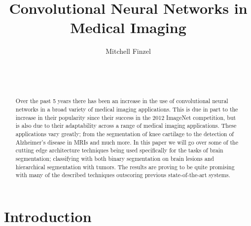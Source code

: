 \documentclass{sig-alternate}
\begin{document}

\title{Convolutional Neural Networks in Medical Imaging}


\author{
\alignauthor
Mitchell Finzel\\
	\\
	\\
	\\
}

\maketitle
\begin{abstract}
Over the past 5 years there has been an increase in the use of convolutional neural networks in a broad variety of medical imaging applications. This is due in part to the increase in their popularity since their success in the 2012 ImageNet competition, but is also due to their adaptability across a range of medical imaging applications. These applications vary greatly; from the segmentation of knee cartilage to the detection of Alzheimer's disease in MRIs and much more. In this paper we will go over some of the cutting edge architecture techniques being used specifically for the tasks of brain segmentation; classifying with both binary segmentation on brain lesions and hierarchical segmentation with tumors. The results are proving to be quite promising with many of the described techniques outscoring previous state-of-the-art systems.

\end{abstract}


\section{Introduction}
\label{sec:introduction}
\end{document}
